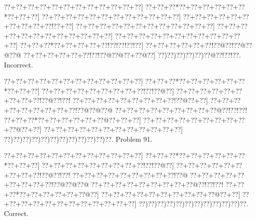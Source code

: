 \documentclass[a5paper]{article}
\begin{document}
\begin{center}
{\goo
\0??+\0??+\0??+\0??+\0??+\0??+\0??+\0??+\0??+\0??+\0??+\0??]
\0??+\0??+\0??*\0??+\0??+\0??+\0??+\0??+\0??*\0??+\0??+\0??]
\0??+\0??+\0??+\0??+\0??+\0??+\0??+\0??+\0??+\0??+\0??+\0??]
\0??+\0??+\0??+\0??+\0??+\0??+\0??+\0??+\0??+\0??!\0??+\0??]
\0??+\0??+\0??+\0??+\0??+\0??+\0??+\0??+\0??+\0??+\0??+\0??]
\0??+\0??+\0??+\0??+\0??+\0??+\0??+\0??+\0??+\0??+\0??+\0??]
\0??+\0??+\0??+\0??+\0??+\0??+\0??+\0??+\0??+\0??+\0??+\0??]
\0??+\0??+\0??*\0??+\0??+\0??+\0??+\0??!\0??!\0??!\0??!\0??]
\0??+\0??+\0??+\0??+\0??+\0??!\0??@\0??!\0??@\0??@\0??@
\0??+\0??+\0??+\0??+\0??+\0??!\0??!\0??@\0??@\0??+\0??@\0??]
\0??)\0??)\0??)\0??)\0??)\0??@\0??!\0??!\0??.
}
Incorrect. 

\end{center}
\newpage
\begin{center}
{\goo
\0??+\0??+\0??+\0??+\0??+\0??+\0??+\0??+\0??+\0??+\0??+\0??]
\0??+\0??+\0??*\0??+\0??+\0??+\0??+\0??+\0??*\0??+\0??+\0??]
\0??+\0??+\0??+\0??+\0??+\0??+\0??+\0??+\0??!\0??!\0??@\0??]
\0??+\0??+\0??+\0??+\0??+\0??+\0??+\0??+\0??!\0??@\0??!\0??!
\0??+\0??+\0??+\0??+\0??+\0??+\0??+\0??+\0??!\0??@\0??+\0??]
\0??+\0??+\0??+\0??+\0??+\0??+\0??+\0??+\0??!\0??@\0??@\0??@
\0??+\0??+\0??+\0??+\0??+\0??+\0??+\0??+\0??@\0??!\0??!\0??!
\0??+\0??+\0??*\0??+\0??+\0??+\0??+\0??+\0??@\0??+\0??+\0??]
\0??+\0??+\0??+\0??+\0??+\0??+\0??+\0??+\0??+\0??@\0??+\0??]
\0??+\0??+\0??+\0??+\0??+\0??+\0??+\0??+\0??+\0??+\0??+\0??]
\0??)\0??)\0??)\0??)\0??)\0??)\0??)\0??)\0??)\0??)\0??)\0??.
}
Problem 91.

\end{center}
\begin{center}
{\goo
\0??+\0??+\0??+\0??+\0??+\0??+\0??+\0??+\0??+\0??+\0??+\0??]
\0??+\0??+\0??*\0??+\0??+\0??+\0??+\0??+\0??*\0??+\0??+\0??]
\0??+\0??+\0??+\0??+\0??+\0??+\0??+\0??+\0??!\0??!\0??@\0??]
\0??+\0??+\0??+\0??+\0??+\0??+\0??+\0??+\0??!\0??@\0??!\0??!
\0??+\0??+\0??+\0??+\0??+\0??+\0??+\0??+\0??!\0??@
\0??+\0??+\0??+\0??+\0??+\0??+\0??+\0??+\0??!\0??@\0??@\0??@
\0??+\0??+\0??+\0??+\0??+\0??+\0??+\0??+\0??@\0??!\0??!\0??!
\0??+\0??+\0??*\0??+\0??+\0??+\0??+\0??+\0??@\0??]
\0??+\0??+\0??+\0??+\0??+\0??+\0??+\0??+\0??+\0??@\0??+\0??]
\0??+\0??+\0??+\0??+\0??+\0??+\0??+\0??+\0??+\0??+\0??+\0??]
\0??)\0??)\0??)\0??)\0??)\0??)\0??)\0??)\0??)\0??)\0??)\0??.
}
Correct. 

\end{center}
\end{document}
